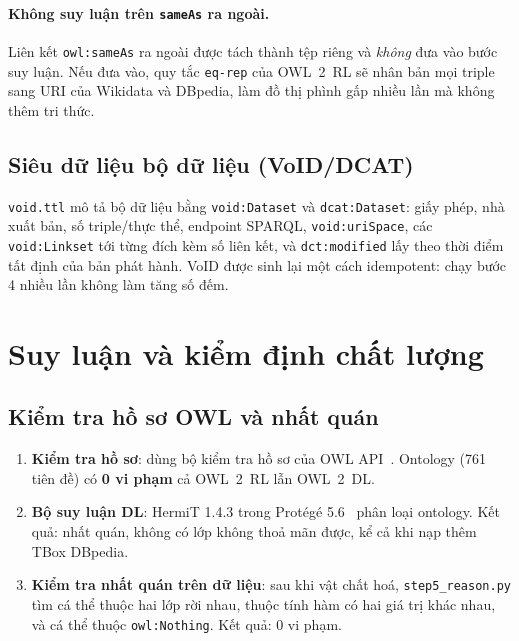 \documentclass[12pt,a4paper]{article}
\begin{document}
\paragraph{Không suy luận trên \texttt{sameAs} ra ngoài.} Liên kết \texttt{owl:sameAs} ra ngoài được tách thành
tệp riêng và \emph{không} đưa vào bước suy luận. Nếu đưa vào, quy tắc \texttt{eq-rep} của OWL~2~RL sẽ nhân bản mọi
triple sang URI của Wikidata và DBpedia, làm đồ thị phình gấp nhiều lần mà không thêm tri thức.

\subsection{Siêu dữ liệu bộ dữ liệu (VoID/DCAT)}
\texttt{void.ttl} mô tả bộ dữ liệu bằng \texttt{void:Dataset} và \texttt{dcat:Dataset}: giấy phép, nhà xuất bản, số
triple/thực thể, endpoint SPARQL, \texttt{void:uriSpace}, các \texttt{void:Linkset} tới từng đích kèm số liên kết, và
\texttt{dct:modified} lấy theo thời điểm tất định của bản phát hành. VoID được sinh lại một cách idempotent: chạy bước
4 nhiều lần không làm tăng số đếm.

\section{Suy luận và kiểm định chất lượng}\label{sec:reason}

\subsection{Kiểm tra hồ sơ OWL và nhất quán}
\begin{enumerate}
  \item \textbf{Kiểm tra hồ sơ}: dùng bộ kiểm tra hồ sơ của OWL API~\cite{horridge2011owlapi}. Ontology (761 tiên đề)
  có \textbf{0 vi phạm} cả OWL~2~RL lẫn OWL~2~DL.
  \item \textbf{Bộ suy luận DL}: HermiT 1.4.3 trong Protégé 5.6~\cite{musen2015protege,glimm2014hermit} phân loại
  ontology. Kết quả: nhất quán, không có lớp không thoả mãn được, kể cả khi nạp thêm TBox DBpedia.
  \item \textbf{Kiểm tra nhất quán trên dữ liệu}: sau khi vật chất hoá, \texttt{step5\_reason.py} tìm cá thể thuộc hai
  lớp rời nhau, thuộc tính hàm có hai giá trị khác nhau, và cá thể thuộc \texttt{owl:Nothing}. Kết quả: 0 vi phạm.
\end{enumerate}
\end{document}

